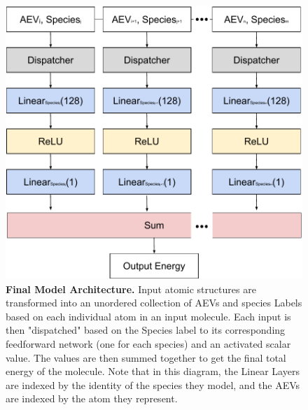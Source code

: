 \documentclass[11pt, twocolumn]{article}
\begin{document}
\begin{figure}[h]
    \centering
    \includegraphics[width=\columnwidth]{figures/bioe142-fig1.pdf}
    \caption{\textbf{Final Model Architecture.} Input atomic structures are transformed into an unordered collection of AEVs and species Labels based on each individual atom in an input molecule. Each input is then "dispatched" based on the Species label to its corresponding feedforward network (one for each species) and an activated scalar value. The values are then summed together to get the final total energy of the molecule. Note that in this diagram, the Linear Layers are indexed by the identity of the species they model, and the AEVs are indexed by the atom they represent.}
    \label{fig:architecture}
\end{figure}

\end{document}

